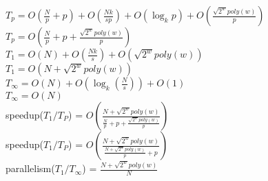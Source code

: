 $T_p = O(\frac{N}{p}+p) + O(\frac{Nk}{sp}) + O(\log_{k}p) + O(\frac{\sqrt{2^{w}}poly(w)}{p})$\\
$T_p = O(\frac{N}{p}+p+\frac{\sqrt{2^{w}}poly(w)}{p})$\\

$T_1 = O(N) + O(\frac{Nk}{s}) + O(\sqrt{2^{w}}poly(w))$\\
$T_1 = O(N+\sqrt{2^{w}}poly(w))$\\

$T_\infty = O(N) + O(\log_{k}(\frac{N}{s})) + O(1)$\\
$T_\infty = O(N)$\\

speedup($T_1/T_P$) = $O(\frac{N+\sqrt{2^{w}}poly(w)}{\frac{N}{p}+p+\frac{\sqrt{2^{w}}poly(w)}{p}})$\\
speedup($T_1/T_P$) = $O(\frac{N+\sqrt{2^{w}}poly(w)}{\frac{N+\sqrt{2^{w}}poly(w)}{p}+p})$\\

parallelism($T_1/T_{\infty}$) = $\frac{N+\sqrt{2^{w}}poly(w)}{N}$

